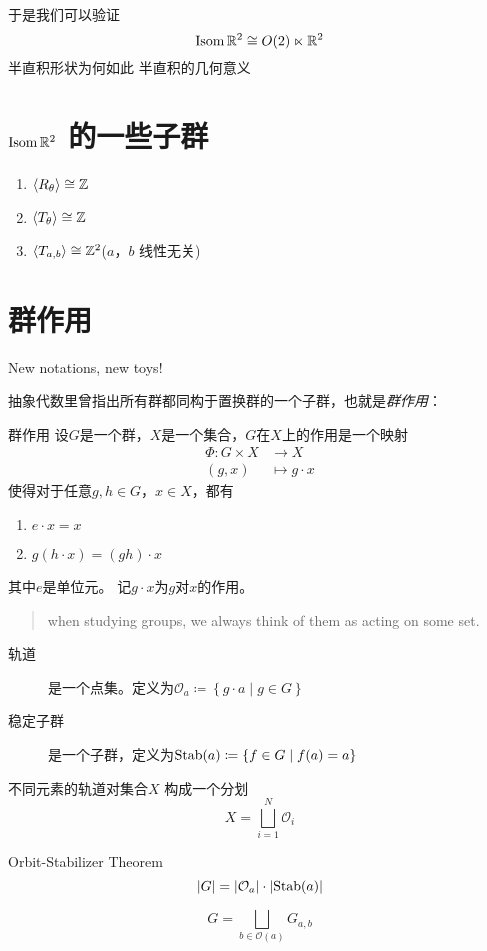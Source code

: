 于是我们可以验证
\[
    \operatorname{\mathrm{Isom}} \mathbb{R}^{2} \cong O(2) \ltimes \mathbb{R}^{2}
\]
半直积形状为何如此
半直积的几何意义

\section{\(\operatorname{\mathrm{Isom}} \mathbb{R}^{2}\) 的一些子群}
\begin{enumerate}
    \item \(\langle R_{\theta} \rangle\cong \mathbb{Z}\)
    \item \(\langle T_{\theta} \rangle\cong \mathbb{Z}\)
    \item \(\langle T_{a,b} \rangle\cong \mathbb{Z}^{2}\)(\(a\)，\(b\) 线性无关)
\end{enumerate}

\section{群作用}
New notations, new toys!

抽象代数里曾指出所有群都同构于置换群的一个子群，也就是\textit{群作用}：

\begin{definition}{群作用}
    设\(G\)是一个群，\(X\)是一个集合，\(G\)在\(X\)上的作用是一个映射
    \begin{align*}
        \Phi: G\times X & \to X \\
        (g,x) & \mapsto g\cdot x
    \end{align*}
    使得对于任意\(g,h\in G\)，\(x\in X\)，都有
    \begin{enumerate}
        \item \(e\cdot x=x\)
        \item \(g(h\cdot x)=(gh)\cdot x\)
    \end{enumerate}
    其中\(e\)是单位元。
    记\(g\cdot x\)为\(g\)对\(x\)的作用。
\end{definition}

\begin{quote}
    when studying groups, we always think of them as acting
    on some set.
\end{quote}


\begin{description}
    \item[轨道]  是一个点集。定义为\(\mathcal{O}_{a}\coloneqq \left\{ g\cdot a
        \mid g\in G \right\}\)
    \item[稳定子群] 是一个子群，定义为\(\operatorname{\mathrm{Stab}}(a)\coloneqq \left\{ f \in G
        \mid f(a)=a \right\}\)
\end{description}

不同元素的轨道对集合\(X\) 构成一个分划
\[
    X=\bigsqcup_{i=1}^{N} \mathcal{O}_{i}
\]


Orbit-Stabilizer Theorem
\[
    \left| G \right| = \left| \mathcal{O}_{a} \right| \cdot
    \left| \operatorname{\mathrm{Stab}}(a) \right|
\]

\[
    G= \bigsqcup_{b\in \mathcal{O}(a)} G_{a,b}
\]

